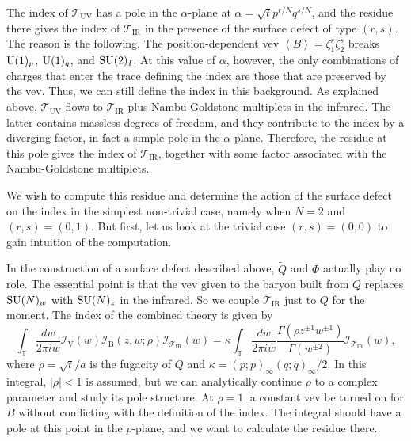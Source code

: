 The index of $\mathcal{T}_{\mathrm{UV}}$ has a pole in the $\alpha$-plane
at $\alpha=\sqrt{t}p^{r/N}q^{s/N}$, and the residue there gives the
index of $\mathcal{T}_{\mathrm{IR}}$ in the presence of the surface
defect of type $(r,s)$. The reason is the following. The position-dependent
vev $\left\langle B\right\rangle =\zeta_{1}^{r}\zeta_{2}^{s}$ breaks
$\mathrm{U}(1)_{p}$, $\mathrm{U}(1)_{q}$, and $\mathrm{SU}(2)_{I}$. At this value of $\alpha$,
however, the only combinations of charges that enter the trace defining
the index are those that are preserved by the vev. Thus, we can still
define the index in this background. As explained above, $\mathcal{T}_{\mathrm{UV}}$
flows to $\mathcal{T}_{\mathrm{IR}}$ plus Nambu-Goldstone multiplets
in the infrared. The latter contains massless degrees of freedom,
and they contribute to the index by a diverging factor, in fact a
simple pole in the $\alpha$-plane. Therefore, the residue at this
pole gives the index of $\mathcal{T}_{\mathrm{IR}}$, together with
some factor associated with the Nambu-Goldstone multiplets.

We wish to compute this residue and determine the action of the surface
defect on the index in the simplest non-trivial case, namely when
$N=2$ and $(r,s)=(0,1)$. But first, let us look at the trivial case
$(r,s)=(0,0)$ to gain intuition of the computation.

In the construction of a surface defect described above, $\tilde{Q}$
and $\Phi$ actually play no role. The essential point is that the
vev given to the baryon built from $Q$ replaces $\mathrm{SU}(N)_{w}$ with
$\mathrm{SU}(N)_{z}$ in the infrared. So we couple $\mathcal{T}_{\mathrm{IR}}$
just to $Q$ for the moment. The index of the combined theory is given
by
\begin{equation}
    \int_{\mathbb{T}}\frac{dw}{2\pi iw}
    \mathcal{I}_{\mathrm{V}}(w)
    \mathcal{I}_{\mathrm{B}}(z,w;\rho)
    \mathcal{I}_{\mathcal{T}_{\mathrm{IR}}}(w)  
      =  
        \kappa  \int_{\mathbb{T}}\frac{dw}{2\pi iw}
        \frac{\Gamma(\rho z^{\pm1}w^{\pm1})}{\Gamma(w^{\pm2})}
        \mathcal{I}_{\mathcal{T}_{\mathrm{IR}}}(w),
\end{equation}
where $\rho=\sqrt{t}/a$ is the fugacity of $Q$ and $\kappa=(p;p)_{\infty}(q;q)_{\infty}/2$.
In this integral, $|\rho|<1$ is assumed, but we can analytically
continue $\rho$ to a complex parameter and study its pole structure.
At $\rho=1$, a constant vev be turned on for $B$ without conflicting
with the definition of the index. The integral should have a pole
at this point in the $p$-plane, and we want to calculate the residue
there.

